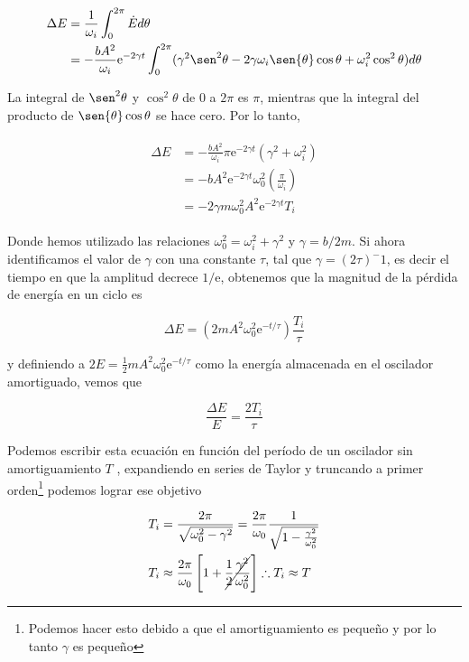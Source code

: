 \documentclass[a4paper,10pt]{article}
\newcommand{\euler}{\mathrm{e}}
\begin{document}
\begin{align}
 \begin{split}
  \Delta E &= \frac{1}{\omega_i} \int_0^{2\pi} \dot{E} d\theta \\
  &= - \frac{bA^2}{\omega_i}\euler^{-2\gamma t}\int_0^{2\pi} 
  (\gamma^2 \sen^2{\theta} - 2\gamma \omega_i \sen{\theta} \cos{\theta} + \omega_i^2 \cos^2{\theta}) d\theta
 \end{split}
\end{align}

La integral de $\sen^2{\theta}$ y $ \cos^2{\theta}$ de 0 a $2\pi$ es $\pi$, mientras
que la integral del producto de $\sen{\theta}\cos{\theta}$ se hace cero. Por lo tanto,

\begin{align}
 \begin{split}
  \Delta E &= - \frac{bA^2}{\omega_i}\pi \euler^{-2\gamma t}(\gamma^2 + \omega_i^2) \\
  &= - b A^2 \euler^{-2\gamma t}\omega_0^2\left(\frac{\pi}{\omega_i}\right) \\
  &= - 2\gamma m \omega_0^2 A^2 \euler^{-2\gamma t}T_i
 \end{split}
\end{align}

Donde hemos utilizado las relaciones $\omega_0^2 = \omega_i^2 + \gamma^2$ y
$\gamma = b/2m$. Si ahora identificamos el valor de $\gamma$ con una
constante $\tau$, tal que $\gamma = (2\tau)^-1$, es decir el tiempo en que 
la amplitud decrece $1/\euler$, obtenemos que la magnitud de la pérdida de energía 
en un ciclo es

$$
\Delta E = \left(2mA^2\omega_0^2\euler^{-t/\tau}\right)\frac{T_i}{\tau}
$$

y definiendo a $2E=\frac{1}{2}mA^2\omega_0^2\euler^{-t/\tau}$ como la energía
almacenada en el oscilador amortiguado, vemos que 

\begin{equation}
 \frac{\Delta E}{E} = \frac{2T_i}{\tau}
\end{equation}

Podemos escribir esta ecuación en función del período de un oscilador sin amortiguamiento $T$
, expandiendo en series de Taylor y truncando a primer orden\footnote{Podemos hacer esto debido
a que el amortiguamiento es pequeño y por lo tanto $\gamma$ es pequeño} podemos 
lograr ese objetivo

\begin{align*}
 \begin{split}
  T_i &= \frac{2\pi}{\sqrt{\omega_0^2-\gamma^2}} = \frac{2\pi}{\omega_0}\frac{1}{\sqrt{1-\frac{\gamma^2}{\omega_0^2}}} \\
  T_i &\approx \frac{2\pi}{\omega_0} \left[1 + \cancel{\frac{1}{2}\frac{\gamma^2}{\omega_0^2}} \right]
  \therefore T_i \approx T
 \end{split}
\end{align*}
\end{document}
